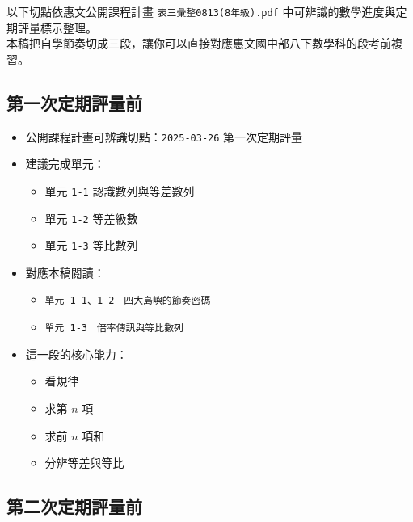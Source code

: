 \documentclass[
  chinese,
  12pt,
  a4paper,
  oneside]{article}
\providecommand{\tightlist}{%
  \setlength{\itemsep}{0pt}\setlength{\parskip}{0pt}}
\begin{document}
以下切點依惠文公開課程計畫 \texttt{表三彙整0813(8年級).pdf}
中可辨識的數學進度與定期評量標示整理。\\
本稿把自學節奏切成三段，讓你可以直接對應惠文國中部八下數學科的段考前複習。

\subsection{第一次定期評量前}\label{ux7b2cux4e00ux6b21ux5b9aux671fux8a55ux91cfux524d}

\begin{itemize}
\tightlist
\item
  公開課程計畫可辨識切點：\texttt{2025-03-26} 第一次定期評量
\item
  建議完成單元：

  \begin{itemize}
  \tightlist
  \item
    單元 \texttt{1-1} 認識數列與等差數列
  \item
    單元 \texttt{1-2} 等差級數
  \item
    單元 \texttt{1-3} 等比數列
  \end{itemize}
\item
  對應本稿閱讀：

  \begin{itemize}
  \tightlist
  \item
    \texttt{單元\ 1-1、1-2　四大島嶼的節奏密碼}
  \item
    \texttt{單元\ 1-3　倍率傳訊與等比數列}
  \end{itemize}
\item
  這一段的核心能力：

  \begin{itemize}
  \tightlist
  \item
    看規律
  \item
    求第 \(n\) 項
  \item
    求前 \(n\) 項和
  \item
    分辨等差與等比
  \end{itemize}
\end{itemize}

\subsection{第二次定期評量前}\label{ux7b2cux4e8cux6b21ux5b9aux671fux8a55ux91cfux524d}
\end{document}
